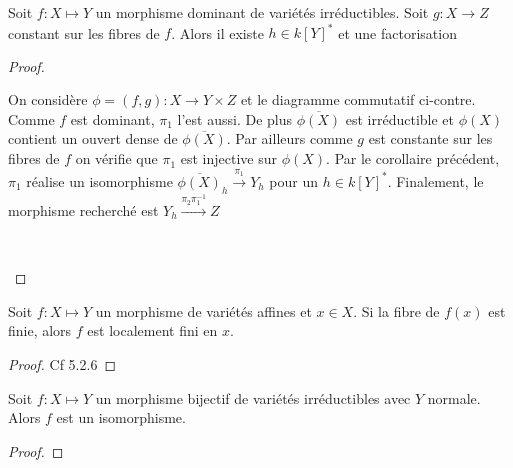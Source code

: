 \begin{prop}\label{facto}
Soit $f:X \mapsto Y$ un morphisme dominant de variétés irréductibles. Soit $g:X \rightarrow Z$ constant sur les fibres de $f$. Alors il existe $h\in k[Y]^*$ et une factorisation
\end{prop}
\begin{proof}
	\begin{multicols}{2}
	On considère $\phi=(f,g):X\rightarrow Y\times Z$ et le diagramme commutatif ci-contre. Comme $f$ est dominant, $\pi_1$ l'est aussi. De plus $\overline{\phi(X)}$ est irréductible et $\phi(X)$ contient un ouvert dense de $\overline{\phi(X)}$. Par ailleurs comme $g$ est constante sur les fibres de $f$ on vérifie que $\pi_1$ est injective sur $\phi(X)$. Par le corollaire précédent, $\pi_1$ réalise un isomorphisme $\overline{\phi(X)}_h \xrightarrow{\pi_1} Y_h$ pour un $h\in k[Y]^*$. Finalement, le morphisme recherché est  $Y_h \xrightarrow{\pi_2\pi_1^{-1}} Z$ 
	
	\columnbreak
	\begin{center}
	\\
	\end{center}
	\end{multicols}
\end{proof}

\begin{prop}
Soit $f:X \mapsto Y$ un morphisme de variétés affines et $x\in X$. Si la fibre de $f(x)$ est finie, alors $f$ est localement fini en $x$.
\end{prop}
\begin{proof}
Cf \cite{LAGSpringer} 5.2.6
\end{proof}

\begin{thm}\label{ZMT}
Soit $f:X \mapsto Y$ un morphisme bijectif de variétés irréductibles avec $Y$ normale. Alors $f$ est un isomorphisme.
\end{thm}
\begin{proof}

\end{proof}


